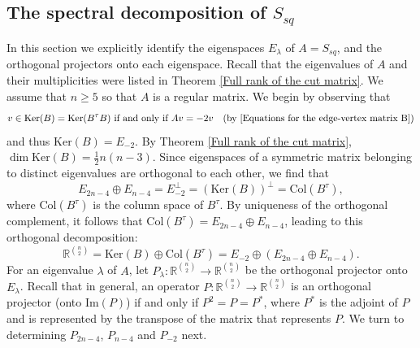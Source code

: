 \documentclass[12pt]{amsart}
\numberwithin{theorem}{section}
\theoremstyle{remark}
\newcommand{\kerr}{\text{Ker}}
\newcommand{\imm}{\text{Im}}
\begin{document}
\subsection{The spectral decomposition of $S_{sq}$}
In this section we explicitly identify the eigenspaces $E_\lambda$ of $A=S_{sq}$, and the orthogonal projectors onto each eigenspace. Recall that the eigenvalues of $A$ and their multiplicities were listed in Theorem \ref{Full rank of the cut matrix}. We assume that $n\ge 5$ so that $A$ is a regular matrix.  
We begin by observing that 
$$v\in \kerr(B) = \kerr(B^\tau B) \text{ if and only if } Av = -2v \quad (\text{by } \eqref{Equations for the edge-vertex matrix B})$$
and thus $\kerr(B) = E_{-2}.$
By Theorem \ref{Full rank of the cut matrix}, $\dim \kerr(B) = \frac{1}{2}n(n-3)$. Since eigenspaces of a symmetric matrix belonging to distinct eigenvalues are orthogonal to each other, we find that  
$$E_{2n-4}\oplus E_{n-4} = E_{-2}^\perp = (\kerr(B))^\perp = \text{Col}(B^\tau),$$
where Col$(B^\tau)$ is the column space of $B^\tau$. By uniqueness of the orthogonal complement, it follows that $\text{Col}(B^\tau) = E_{2n-4}\oplus E_{n-4}$, leading to this orthogonal decomposition: 
\begin{equation} \label{Decomposition into kernel of B and column space of B transpose}
\mathbb R^{n\choose 2} = \kerr(B) \oplus \text{Col}(B^\tau) = E_{-2}\oplus \left(E_{2n-4}\oplus E_{n-4} \right).
\end{equation} 
For an eigenvalue $\lambda $ of $A$, let $P_\lambda :\mathbb R^{n\choose 2} \to \mathbb  R^{n\choose 2}$ be the orthogonal projector onto $E_\lambda$. Recall that in general, an operator $P :\mathbb R^{n\choose 2} \to \mathbb R^{n\choose 2}$ is an orthogonal projector (onto $\imm(P)$) if and only if $P^2 = P = P^\ast$, where $P^\ast$ is the adjoint of $P$ and is represented by the transpose of the matrix that represents $P$. We turn to determining $P_{2n-4}$, $P_{n-4}$ and $P_{-2}$ next. 
\end{document}
